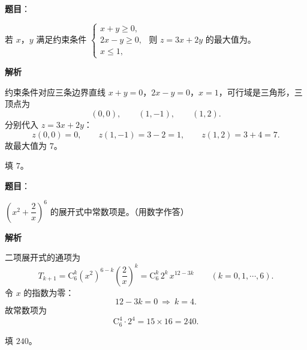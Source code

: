 \begin{answer}

\textbf{题目}：

若 $x$，$y$ 满足约束条件 $\begin{cases}x+y\geqslant0,\\2x-y\geqslant0,\\x\leqslant1,\end{cases}$ 则 $z=3x+2y$ 的最大值为\gkblank{}。

\textbf{解析}

约束条件对应三条边界直线 $x+y=0$，$2x-y=0$，$x=1$，可行域是三角形，三顶点为
\nopagebreak[4]
\[(0,0),\qquad (1,-1),\qquad (1,2).\]
分别代入 $z=3x+2y$：
\nopagebreak[4]
\[z(0,0)=0,\qquad z(1,-1)=3-2=1,\qquad z(1,2)=3+4=7 .\]
故最大值为 $7$。

填 $7$。


\end{answer}
\begin{answer}

\textbf{题目}：

$\left(x^2+\dfrac2x\right)^6$ 的展开式中常数项是\gkblank{}。（用数字作答）

\textbf{解析}

二项展开式的通项为
\nopagebreak[4]
\[T_{k+1}=\mathrm C_6^k\left(x^2\right)^{6-k}\left(\frac2x\right)^k=\mathrm C_6^k\,2^k\,x^{12-3k}\qquad(k=0,1,\cdots,6).\]
令 $x$ 的指数为零：
\nopagebreak[4]
\[12-3k=0\ \Longrightarrow\ k=4 .\]
故常数项为
\nopagebreak[4]
\[\mathrm C_6^4\cdot2^4=15\times16=240 .\]

填 $240$。


\end{answer}
